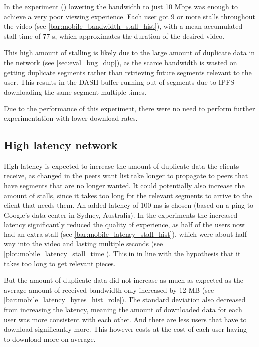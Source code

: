 In the experiment () lowering the bandwidth to just 10 \ac{Mbps} was enough to achieve a very poor viewing experience. Each user got 9 or more stalls throughout the video (see \autoref{bar:mobile_bandwidth_stall_hist}), with a mean accumulated stall time of 77 \ac{s}, which approximates the duration of the desired video.

This high amount of stalling is likely due to the large amount of duplicate data in the network (see \autoref{sec:eval_bug_dup}), as the scarce bandwidth is wasted on getting duplicate segments rather than retrieving future segments relevant to the user. This results in the \ac{DASH} buffer running out of segments due to \ac{IPFS} downloading the same segment multiple times.

Due to the performance of this experiment, there were no need to perform further experimentation with lower download rates.

\if{}

\fi

\subsection{High latency network}
\label{sec:eval_high_latency}
High latency is expected to increase the amount of duplicate data the clients receive, as changed in the peers want list take longer to propagate to peers that have segments that are no longer wanted. It could potentially also increase the amount of stalls, since it takes too long for the relevant segments to arrive to the client that needs them. An added latency of 100 \ac{ms} is chosen (based on a ping to Google's data center in Sydney, Australia).
In the experiments the increased latency significantly reduced the quality of experience, as half of the users now had an extra stall (see \autoref{bar:mobile_latency_stall_hist}), which were about half way into the video and lasting multiple seconds (see \autoref{plot:mobile_latency_stall_time}). This in in line with the hypothesis that it takes too long to get relevant pieces.

\if{}


\fi

But the amount of duplicate data did not increase as much as expected as the average amount of received bandwidth only increased by 12 \ac{MB} (see \autoref{bar:mobile_latency_bytes_hist_role}). The standard deviation also decreased from increasing the latency, meaning the amount of downloaded data for each user was more consistent with each other. And there are less users that have to download significantly more. This however costs at the cost of each user having to download more on average.

